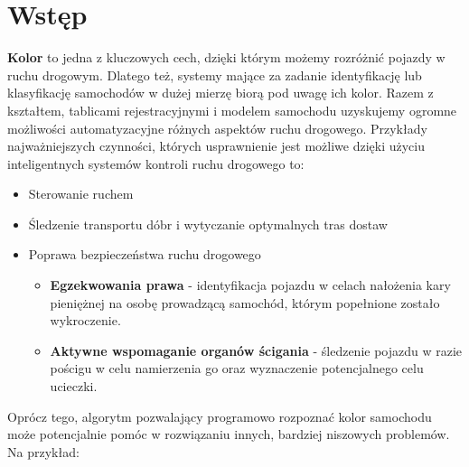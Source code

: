 \section*{Wstęp} 

\textbf{Kolor} to jedna z kluczowych cech, dzięki którym możemy rozróżnić pojazdy w ruchu drogowym. Dlatego też, systemy mające za zadanie identyfikację lub klasyfikację samochodów w dużej mierzę biorą pod uwagę ich kolor. 
Razem z kształtem, tablicami rejestracyjnymi i modelem samochodu uzyskujemy ogromne możliwości automatyzacyjne różnych aspektów ruchu drogowego. 
Przykłady najważniejszych czynności, których usprawnienie jest możliwe dzięki użyciu inteligentnych systemów kontroli ruchu drogowego to: 
\begin{itemize}
    \item Sterowanie ruchem
    \item Śledzenie transportu dóbr i wytyczanie optymalnych tras dostaw
    \item Poprawa bezpieczeństwa ruchu drogowego
    
    \begin{itemize}
        \item \textbf{Egzekwowania prawa} - identyfikacja pojazdu w celach nałożenia kary pieniężnej na osobę prowadzącą samochód, którym popełnione zostało wykroczenie.
        
        \item \textbf{Aktywne wspomaganie organów ścigania} - śledzenie pojazdu w razie pościgu w celu namierzenia go oraz wyznaczenie potencjalnego celu ucieczki.
    \end{itemize}
\end{itemize}
Oprócz tego, algorytm pozwalający programowo rozpoznać kolor samochodu może potencjalnie pomóc w rozwiązaniu innych, bardziej niszowych problemów. Na przykład:


